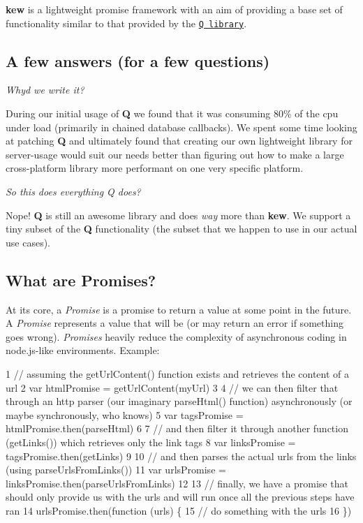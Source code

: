 {\bfseries kew} is a lightweight promise framework with an aim of providing a base set of functionality similar to that provided by the \href{https://github.com/kriskowal/q}{\tt Q library}.

\subsection*{A few answers (for a few questions) }

{\itshape Why\textquotesingle{}d we write it?}

During our initial usage of {\bfseries Q} we found that it was consuming 80\% of the cpu under load (primarily in chained database callbacks). We spent some time looking at patching {\bfseries Q} and ultimately found that creating our own lightweight library for server-\/usage would suit our needs better than figuring out how to make a large cross-\/platform library more performant on one very specific platform.

{\itshape So this does everything Q does?}

Nope! {\bfseries Q} is still an awesome library and does {\itshape way} more than {\bfseries kew}. We support a tiny subset of the {\bfseries Q} functionality (the subset that we happen to use in our actual use cases).

\subsection*{What are Promises? }

At its core, a {\itshape Promise} is a promise to return a value at some point in the future. A {\itshape Promise} represents a value that will be (or may return an error if something goes wrong). {\itshape Promises} heavily reduce the complexity of asynchronous coding in node.\+js-\/like environments. Example\+:


\begin{DoxyCode}
1 // assuming the getUrlContent() function exists and retrieves the content of a url
2 var htmlPromise = getUrlContent(myUrl)
3 
4 // we can then filter that through an http parser (our imaginary parseHtml() function) asynchronously (or
       maybe synchronously, who knows)
5 var tagsPromise = htmlPromise.then(parseHtml)
6 
7 // and then filter it through another function (getLinks()) which retrieves only the link tags
8 var linksPromise = tagsPromise.then(getLinks)
9 
10 // and then parses the actual urls from the links (using parseUrlsFromLinks())
11 var urlsPromise = linksPromise.then(parseUrlsFromLinks)
12 
13 // finally, we have a promise that should only provide us with the urls and will run once all the previous
       steps have ran
14 urlsPromise.then(function (urls) \{
15   // do something with the urls
16 \})
\end{DoxyCode}


